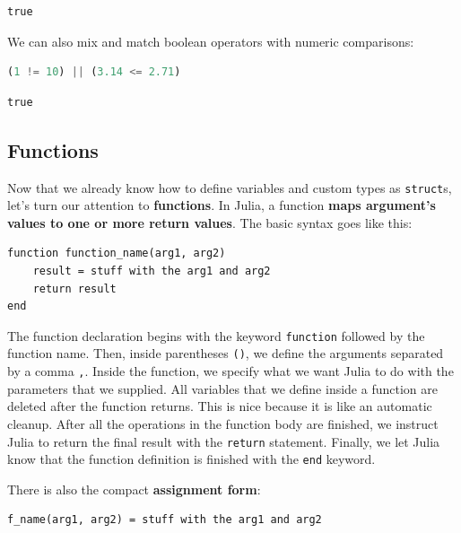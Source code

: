 \documentclass[
  notoc %
]{tufte-book}
\newcommand{\passthrough}[1]{#1}
\begin{document}
\begin{lstlisting}[language=Output]
true
\end{lstlisting}

We can also mix and match boolean operators with numeric comparisons:

\begin{lstlisting}[language=Julia]
(1 != 10) || (3.14 <= 2.71)
\end{lstlisting}

\begin{lstlisting}[language=Output]
true
\end{lstlisting}

\hypertarget{sec:function}{%
\subsection{Functions}\label{sec:function}}

Now that we already know how to define variables and custom types as
\passthrough{\lstinline!struct!}s, let's turn our attention to
\textbf{functions}. In Julia, a function \textbf{maps argument's values
to one or more return values}. The basic syntax goes like this:

\begin{lstlisting}
function function_name(arg1, arg2)
    result = stuff with the arg1 and arg2
    return result
end
\end{lstlisting}

The function declaration begins with the keyword
\passthrough{\lstinline!function!} followed by the function name. Then,
inside parentheses \passthrough{\lstinline!()!}, we define the arguments
separated by a comma \passthrough{\lstinline!,!}. Inside the function,
we specify what we want Julia to do with the parameters that we
supplied. All variables that we define inside a function are deleted
after the function returns. This is nice because it is like an automatic
cleanup. After all the operations in the function body are finished, we
instruct Julia to return the final result with the
\passthrough{\lstinline!return!} statement. Finally, we let Julia know
that the function definition is finished with the
\passthrough{\lstinline!end!} keyword.

There is also the compact \textbf{assignment form}:

\begin{lstlisting}
f_name(arg1, arg2) = stuff with the arg1 and arg2
\end{lstlisting}
\end{document}
